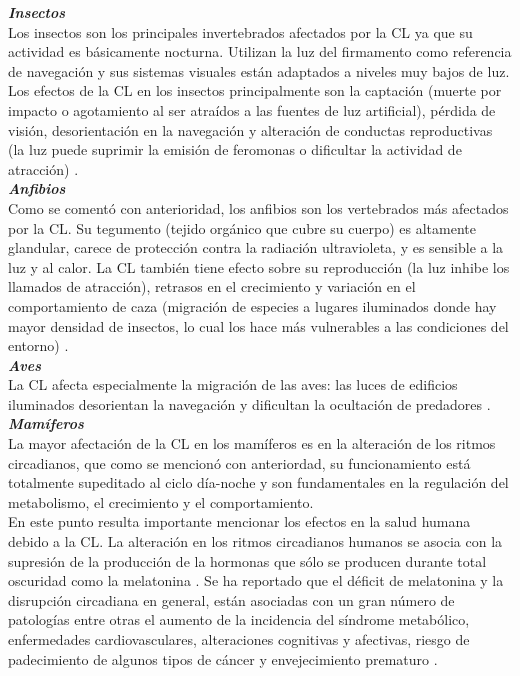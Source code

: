 \textit{\textbf{Insectos}}\\

Los insectos son los principales invertebrados afectados por la CL ya que su actividad es básicamente nocturna. Utilizan  la luz del firmamento como referencia de navegación y sus sistemas visuales están adaptados a niveles muy bajos de luz. Los efectos de la CL en los insectos principalmente son la captación (muerte por impacto o agotamiento al ser atraídos a las fuentes de luz artificial), pérdida de visión, desorientación en la navegación y alteración de conductas reproductivas (la luz puede suprimir la emisión de feromonas o dificultar la actividad de atracción) \citep{CEI2017,Davies2013}.\\

\textit{\textbf{Anfibios}}\\

Como se comentó con anterioridad, los anfibios son los vertebrados más afectados por la CL. Su tegumento (tejido orgánico que cubre su cuerpo) es altamente glandular, carece de protección contra la radiación ultravioleta, y es sensible a la luz y al calor. La CL también tiene efecto sobre su reproducción (la luz inhibe los llamados de atracción), retrasos en el crecimiento y variación en el comportamiento de caza (migración de especies a lugares iluminados donde hay mayor densidad de insectos, lo cual los hace más vulnerables a las condiciones del entorno) \citep{Longcore2006,LibroCL}.\\

\textit{\textbf{Aves}}\\

La CL afecta especialmente la migración de las aves: las luces de edificios iluminados desorientan la navegación y dificultan la ocultación de predadores \citep{Longcore2006}.\\

\textit{\textbf{Mamíferos}}\\

La mayor afectación de la CL en los mamíferos es en la alteración de los ritmos circadianos, que como se mencionó con anteriordad, su funcionamiento está totalmente supeditado al ciclo día-noche y son fundamentales en la regulación del metabolismo, el crecimiento y el comportamiento.\\

En este punto resulta importante mencionar los efectos en la salud humana debido a la CL. La alteración en los ritmos circadianos humanos se asocia con la supresión de la producción de la hormonas que sólo se producen durante total oscuridad como la melatonina \citep{LibroCL}. Se ha reportado que el déficit de melatonina y la disrupción circadiana en general, están asociadas con un gran número de patologías entre otras el aumento de la incidencia del síndrome metabólico, enfermedades cardiovasculares, alteraciones cognitivas y afectivas, riesgo de padecimiento de algunos tipos de cáncer y envejecimiento prematuro \citep{CEI2017,LibroCL}.\\

